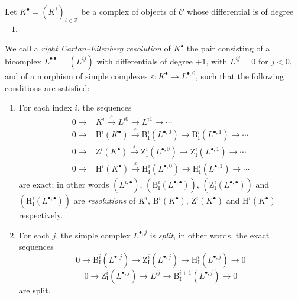 \begin{env}[11.4.2]
\label{0.11.4.2}
Let $K^\bullet=(K^i)_{i\in\mathbb Z}$ be a complex of objects of $\mathcal C$
whose differential is of degree $+1$.

We call a \emph{right Cartan--Eilenberg resolution} of $K^\bullet$ the
pair consisting of a bicomplex $L^{\bullet\bullet}=(L^{ij})$ with
differentials of degree $+1$, with $L^{ij}=0$ for $j<0$, and of a morphism of
simple complexes $\varepsilon:K^\bullet\to L^{\bullet,0}$, such that the
following conditions are satisfied:
\begin{enumerate}
  \item[(i)] For each index $i$, the sequences
    \[
    \begin{aligned}
      0\longrightarrow{}&K^i\xrightarrow{\varepsilon}L^{i0}
        \longrightarrow L^{i1}\longrightarrow\cdots\\
      0\longrightarrow{}&\mathrm B^i(K^\bullet)\xrightarrow{\varepsilon}
        \mathrm B_{\mathrm I}^i(L^{\bullet,0})
        \longrightarrow\mathrm B_{\mathrm I}^i(L^{\bullet,1})
        \longrightarrow\cdots\\
      0\longrightarrow{}&\mathrm Z^i(K^\bullet)\xrightarrow{\varepsilon}
        \mathrm Z_{\mathrm I}^i(L^{\bullet,0})
        \longrightarrow\mathrm Z_{\mathrm I}^i(L^{\bullet,1})
        \longrightarrow\cdots\\
      0\longrightarrow{}&\mathrm H^i(K^\bullet)\xrightarrow{\varepsilon}
        \mathrm H_{\mathrm I}^i(L^{\bullet,0})
        \longrightarrow\mathrm H_{\mathrm I}^i(L^{\bullet,1})
        \longrightarrow\cdots
    \end{aligned}
    \]
    are exact; in other words $(L^{i,\bullet})$,
    $(\mathrm B_{\mathrm I}^i(L^{\bullet,\bullet}))$,
    $(\mathrm Z_{\mathrm I}^i(L^{\bullet,\bullet}))$ and
    $(\mathrm H_{\mathrm I}^i(L^{\bullet,\bullet}))$ are
    \emph{resolutions} of $K^i$, $\mathrm B^i(K^\bullet)$,
    $\mathrm Z^i(K^\bullet)$ and $\mathrm H^i(K^\bullet)$ respectively.
  \item[(ii)] For each $j$, the simple complex $L^{\bullet,j}$ is
    \emph{split}, in other words, the exact sequences
    \[
      \label{0.11.4.2.1}
      0\longrightarrow\mathrm B_{\mathrm I}^i(L^{\bullet,j})
      \longrightarrow\mathrm Z_{\mathrm I}^i(L^{\bullet,j})
      \longrightarrow\mathrm H_{\mathrm I}^i(L^{\bullet,j})
      \longrightarrow0
      \tag{11.4.2.1}
    \]
    \[
      \label{0.11.4.2.2}
      0\longrightarrow\mathrm Z_{\mathrm I}^i(L^{\bullet,j})
      \longrightarrow L^{ij}
      \longrightarrow\mathrm B_{\mathrm I}^{i+1}(L^{\bullet,j})
      \longrightarrow0
      \tag{11.4.2.2}
    \]
    are split.
\end{enumerate}


\end{env}
